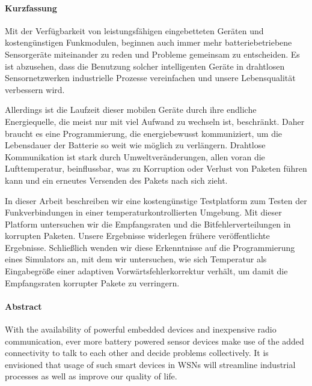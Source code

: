 \cleardoublepage


\begin{center}
\paragraph{Kurzfassung}
\hrulefill

\end{center}

Mit der Verfügbarkeit von leistungsfähigen eingebetteten Geräten und kostengün\-stigen Funkmodulen, beginnen auch immer mehr batteriebetriebene Sensorgeräte miteinander zu reden und Probleme gemeinsam zu entscheiden.
Es ist abzusehen, dass die Benutzung solcher intelligenten Geräte in drahtlosen Sensornetzwerken in\-dustrielle Prozesse vereinfachen und unsere Lebensqualität verbessern wird.

Allerdings ist die Laufzeit dieser mobilen Geräte durch ihre endliche Energiequelle, die meist nur mit viel Aufwand zu wechseln ist, beschränkt. Daher braucht es eine Programmierung, die energiebewusst kommuniziert, um die Lebensdauer der Bat\-terie so weit wie möglich zu verlängern.
Drahtlose Kommunikation ist stark durch Umweltveränderungen, allen voran die Lufttemperatur, beinflussbar, was zu Korrup\-tion oder Verlust von Paketen führen kann und ein erneutes Versenden des Pakets nach sich zieht.

In dieser Arbeit beschreiben wir eine kostengünstige Testplatform zum Testen der Funkverbindungen in einer temperaturkontrollierten Umgebung. Mit dieser Plat\-form untersuchen wir die Empfangsraten und die Bitfehlerverteilungen in korrupten Paketen.
Unsere Ergebnisse widerlegen frühere veröffentlichte Ergebnisse.
Schließ\-lich wenden wir diese Erkenntnisse auf die Programmierung eines Simulators an, mit dem wir untersuchen, wie sich Temperatur als Eingabegröße einer adaptiven Vorwärtsfehlerkorrektur verhält, um damit die Empfangsraten korrupter Pakete zu verringern.


\vspace {0.5cm}
\begin{center}
\paragraph{Abstract}
\hrulefill
\end{center}

With the availability of powerful embedded devices and inexpensive radio communication, ever more battery powered sensor devices make use of the added connectivity to talk to each other and decide problems collectively.
It is envisioned that usage of such smart devices in \acl{WSN}s will streamline industrial processes as well as improve our quality of life.

